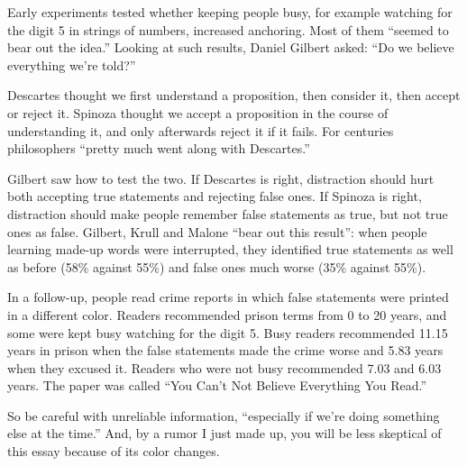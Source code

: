 
Early experiments tested whether keeping people busy, for example watching for the digit 5 in strings of numbers, increased anchoring. Most of them ``seemed to bear out the idea.'' Looking at such results, Daniel Gilbert asked: ``Do we believe everything we're told?''

Descartes thought we first understand a proposition, then consider it, then accept or reject it. Spinoza thought we accept a proposition in the course of understanding it, and only afterwards reject it if it fails. For centuries philosophers ``pretty much went along with Descartes.'' 

Gilbert saw how to test the two. If Descartes is right, distraction should hurt both accepting true statements and rejecting false ones. If Spinoza is right, distraction should make people remember false statements as true, but not true ones as false. Gilbert, Krull and Malone ``bear out this result'': when people learning made-up words were interrupted, they identified true statements as well as before (58\% against 55\%) and false ones much worse (35\% against 55\%). 

In a follow-up, people read crime reports in which false statements were printed in a different color. Readers recommended prison terms from 0 to 20 years, and some were kept busy watching for the digit 5. Busy readers recommended 11.15 years in prison when the false statements made the crime worse and 5.83 years when they excused it. Readers who were not busy recommended 7.03 and 6.03 years. The paper was called ``You Can't Not Believe Everything You Read.''

So be careful with unreliable information, ``especially if we're doing something else at the time.'' And, by a rumor I just made up, you will be less skeptical of this essay because of its color changes.
